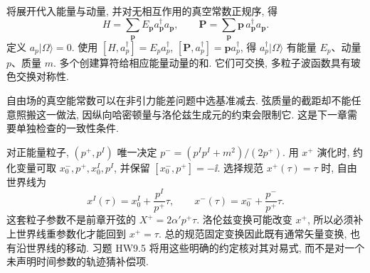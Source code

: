 将展开代入能量与动量, 并对无相互作用的真空常数正规序, 得
\[
 H=\sum_{\boldsymbol p}E_{\boldsymbol p}a_{\boldsymbol p}^\dagger a_{\boldsymbol p},
 \qquad\boldsymbol P=\sum_{\boldsymbol p}\boldsymbol p\,
 a_{\boldsymbol p}^\dagger a_{\boldsymbol p}.
\]
定义 $a_p|\Omega\rangle=0$. 使用 $[H,a_p^\dagger]=E_pa_p^\dagger$,
$[\boldsymbol P,a_p^\dagger]=\boldsymbol p a_p^\dagger$, 得
$a_p^\dagger|\Omega\rangle$ 有能量 $E_p$、动量 $p$、质量 $m$. 多个创建算符给相应能量动量的和. 它们可交换, 多粒子波函数具有玻色交换对称性.

自由场的真空能常数可以在非引力能差问题中选基准减去. 弦质量的截距却不能任意照搬这一做法, 因纵向哈密顿量与洛伦兹生成元的约束会限制它. 这是下一章需要单独检查的一致性条件.

对正能量粒子, $(p^+,p^I)$ 唯一决定 $p^-=(p^Ip^I+m^2)/(2p^+)$. 用 $x^+$ 演化时, 约化变量可取 $x_0^-,p^+,x_0^I,p^I$, 并保留 $[x_0^-,p^+]=-\ii$.
选择规范 $x^+(\tau)=\tau$ 时, 自由世界线为
\[
 x^I(\tau)=x_0^I+\frac{p^I}{p^+}\tau,\qquad
 x^-(\tau)=x_0^-+\frac{p^-}{p^+}\tau.
\]
这套粒子参数不是前章开弦的 $X^+=2\alpha'p^+\tau$. 洛伦兹变换可能改变 $x^+$, 所以必须补上世界线重参数化才能回到 $x^+=\tau$. 总的规范固定变换因此既有通常矢量变换, 也有沿世界线的移动. 习题 HW9.5 将用这些明确的约定核对其对易式, 而不是对一个未声明时间参数的轨迹猜补偿项.
